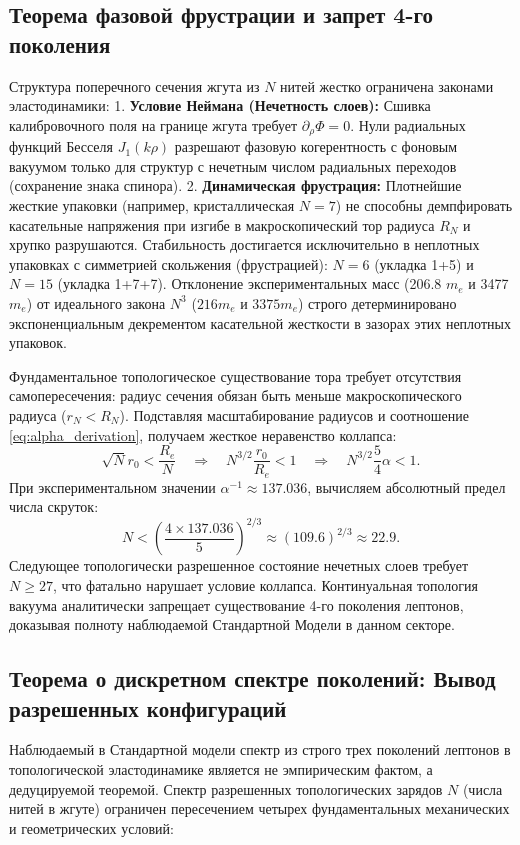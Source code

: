 \documentclass[11pt,a4paper]{article}
\begin{document}
	\subsection{Теорема фазовой фрустрации и запрет 4-го поколения}
	Структура поперечного сечения жгута из $N$ нитей жестко ограничена законами эластодинамики:
	1. \textbf{Условие Неймана (Нечетность слоев):} Сшивка калибровочного поля на границе жгута требует $\partial_\rho \Phi = 0$. Нули радиальных функций Бесселя $J_1(k\rho)$ разрешают фазовую когерентность с фоновым вакуумом только для структур с нечетным числом радиальных переходов (сохранение знака спинора).
	2. \textbf{Динамическая фрустрация:} Плотнейшие жесткие упаковки (например, кристаллическая $N=7$) не способны демпфировать касательные напряжения при изгибе в макроскопический тор радиуса $R_N$ и хрупко разрушаются. Стабильность достигается исключительно в неплотных упаковках с симметрией скольжения (фрустрацией): $N=6$ (укладка 1+5) и $N=15$ (укладка 1+7+7).
	Отклонение экспериментальных масс (206.8 $m_e$ и 3477 $m_e$) от идеального закона $N^3$ ($216 m_e$ и $3375 m_e$) строго детерминировано экспоненциальным декрементом касательной жесткости в зазорах этих неплотных упаковок.
	
	Фундаментальное топологическое существование тора требует отсутствия самопересечения: радиус сечения обязан быть меньше макроскопического радиуса ($r_N < R_N$). Подставляя масштабирование радиусов и соотношение \eqref{eq:alpha_derivation}, получаем жесткое неравенство коллапса:
	\begin{equation}
		\sqrt{N} r_0 < \frac{R_e}{N} \quad \Longrightarrow \quad N^{3/2} \frac{r_0}{R_e} < 1 \quad \Longrightarrow \quad N^{3/2} \frac{5}{4}\alpha < 1.
	\end{equation}
	При экспериментальном значении $\alpha^{-1} \approx 137.036$, вычисляем абсолютный предел числа скруток:
	\begin{equation}
		N < \left( \frac{4 \times 137.036}{5} \right)^{2/3} \approx (109.6)^{2/3} \approx 22.9.
	\end{equation}
	Следующее топологически разрешенное состояние нечетных слоев требует $N \ge 27$, что фатально нарушает условие коллапса. Континуальная топология вакуума аналитически запрещает существование 4-го поколения лептонов, доказывая полноту наблюдаемой Стандартной Модели в данном секторе.
	
	\subsection{Теорема о дискретном спектре поколений: Вывод разрешенных конфигураций}
	Наблюдаемый в Стандартной модели спектр из строго трех поколений лептонов в топологической эластодинамике является не эмпирическим фактом, а дедуцируемой теоремой. Спектр разрешенных топологических зарядов $N$ (числа нитей в жгуте) ограничен пересечением четырех фундаментальных механических и геометрических условий:
	
\end{document}
